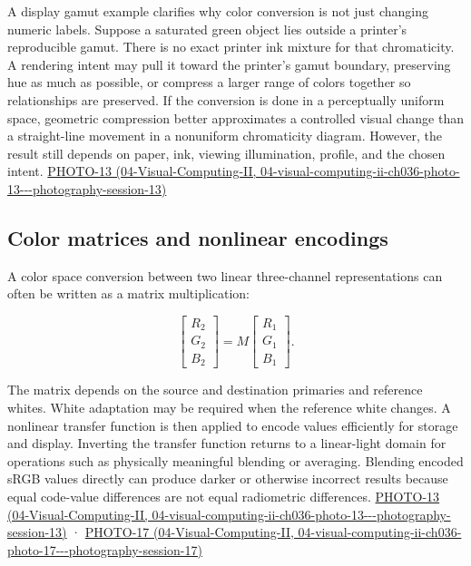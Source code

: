 A display gamut example clarifies why color conversion is not just changing numeric labels. Suppose a saturated green object lies outside a printer's reproducible gamut. There is no exact printer ink mixture for that chromaticity. A rendering intent may pull it toward the printer's gamut boundary, preserving hue as much as possible, or compress a larger range of colors together so relationships are preserved. If the conversion is done in a perceptually uniform space, geometric compression better approximates a controlled visual change than a straight-line movement in a nonuniform chromaticity diagram. However, the result still depends on paper, ink, viewing illumination, profile, and the chosen intent. \href{../04-Visual-Computing-II/main.pdf\#nameddest=04-visual-computing-ii-ch036-photo-13---photography-session-13}{PHOTO-13 (04-Visual-Computing-II, 04-visual-computing-ii-ch036-photo-13-\/-\/-photography-session-13)}

\subsection{Color matrices and nonlinear encodings}\label{03-visual-computing-i-ch004-color-matrices-and-nonlinear-encodings}

A color space conversion between two linear three-channel representations can often be written as a matrix multiplication:

\[
\begin{bmatrix}R_2\\G_2\\B_2\end{bmatrix}
=M\begin{bmatrix}R_1\\G_1\\B_1\end{bmatrix}.
\]

The matrix depends on the source and destination primaries and reference whites. White adaptation may be required when the reference white changes. A nonlinear transfer function is then applied to encode values efficiently for storage and display. Inverting the transfer function returns to a linear-light domain for operations such as physically meaningful blending or averaging. Blending encoded sRGB values directly can produce darker or otherwise incorrect results because equal code-value differences are not equal radiometric differences. \href{../04-Visual-Computing-II/main.pdf\#nameddest=04-visual-computing-ii-ch036-photo-13---photography-session-13}{PHOTO-13 (04-Visual-Computing-II, 04-visual-computing-ii-ch036-photo-13-\/-\/-photography-session-13)} · \href{../04-Visual-Computing-II/main.pdf\#nameddest=04-visual-computing-ii-ch036-photo-17---photography-session-17}{PHOTO-17 (04-Visual-Computing-II, 04-visual-computing-ii-ch036-photo-17-\/-\/-photography-session-17)}

